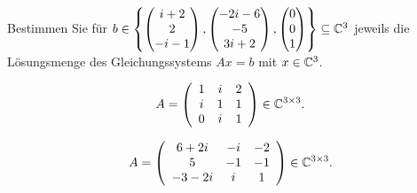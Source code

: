 \begin{Problem}
	Bestimmen Sie f\"{u}r $b\in \left\{ \begin{pmatrix} i+2 \\ 2 \\ -i-1 \end{pmatrix} , \begin{pmatrix} -2i-6 \\ -5 \\ 3i+2 \end{pmatrix} , \begin{pmatrix} 0 \\ 0 \\ 1 \end{pmatrix}  \right\} \subseteq \mathbb{C}^3$ jeweils die Lösungsmenge des Gleichungssystems $Ax=b$ mit $x\in \mathbb{C}^3$.	
	\begin{parts}
		\item 
			\[
			A=\left(
\begin{array}{ccc}
 1 & i & 2 \\
 i & 1 & 1 \\
 0 & i & 1 \\
\end{array}
\right)\in \mathbb{C}^{3\times 3} 
			.\] 
		\item 
			\[
			A=\left(
\begin{array}{ccc}
 6+2 i & -i & -2 \\
 5 & -1 & -1 \\
 -3-2 i & i & 1 \\
\end{array}
\right)\in \mathbb{C}^{3\times 3} 
			.\] 
	\end{parts}
\end{Problem}
